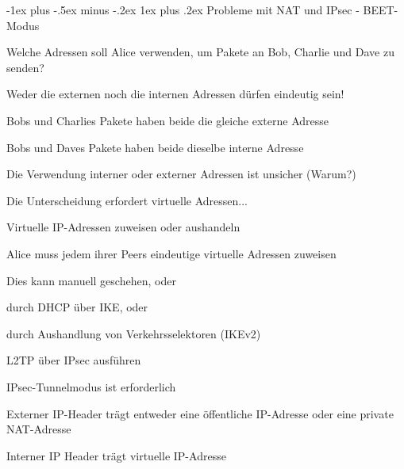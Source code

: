 \documentclass[a4paper]{article}
\makeatletter
\renewcommand{\subsubsection}{\@startsection{subsubsection}{3}{0mm}%
 {-1ex plus -.5ex minus -.2ex}%
 {1ex plus .2ex}%
 {\normalfont\small\bfseries}}
\makeatother
\begin{document}
\begin{multicols}{3}
\begin{itemize*}
            \subsubsection{Probleme mit NAT und IPsec -
                  BEET-Modus}
            \begin{itemize*}
                  \item Welche Adressen soll Alice verwenden, um Pakete an Bob, Charlie und
                  Dave zu senden?
                  \item Weder die externen noch die internen Adressen dürfen eindeutig sein!
                  \begin{itemize*}
                        \item Bobs und Charlies Pakete haben beide die gleiche externe Adresse
                        \item Bobs und Daves Pakete haben beide dieselbe interne Adresse
                        \item Die Verwendung interner oder externer Adressen ist unsicher (Warum?)
                        \item Die Unterscheidung erfordert virtuelle Adressen...
                  \end{itemize*}
                  \item Virtuelle IP-Adressen zuweisen oder aushandeln
                  \begin{itemize*}
                        \item Alice muss jedem ihrer Peers eindeutige virtuelle Adressen zuweisen
                        \item Dies kann manuell geschehen, oder
                        \item durch DHCP über IKE, oder
                        \item durch Aushandlung von Verkehrsselektoren (IKEv2)
                        \item L2TP über IPsec ausführen
                  \end{itemize*}
                  \item IPsec-Tunnelmodus ist erforderlich
                  \begin{itemize*}
                        \item Externer IP-Header trägt entweder eine öffentliche IP-Adresse oder eine private NAT-Adresse
                        \item Interner IP Header trägt virtuelle IP-Adresse

\end{itemize*}
\end{itemize*}
\end{itemize*}
\end{multicols}
\end{document}
